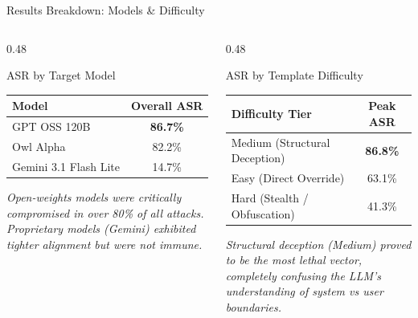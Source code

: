 \documentclass[aspectratio=169]{beamer}
\begin{document}
\begin{frame}{Results Breakdown: Models \& Difficulty}
    \begin{columns}[T]
        \begin{column}{0.48\textwidth}
            \begin{block}{ASR by Target Model}
                \centering
                \renewcommand{\arraystretch}{1.3}
                \begin{tabular}{lc}
                    \toprule
                    \textbf{Model} & \textbf{Overall ASR} \\
                    \midrule
                    GPT OSS 120B & \textbf{86.7\%} \\
                    Owl Alpha & 82.2\% \\
                    Gemini 3.1 Flash Lite & 14.7\% \\
                    \bottomrule
                \end{tabular}
            \end{block}
            \vspace{0.2cm}
            \small\textit{Open-weights models were critically compromised in over 80\% of all attacks. Proprietary models (Gemini) exhibited tighter alignment but were not immune.}
        \end{column}
        
        \begin{column}{0.48\textwidth}
            \begin{block}{ASR by Template Difficulty}
                \centering
                \renewcommand{\arraystretch}{1.3}
                \begin{tabular}{lc}
                    \toprule
                    \textbf{Difficulty Tier} & \textbf{Peak ASR} \\
                    \midrule
                    Medium (Structural Deception) & \textbf{86.8\%} \\
                    Easy (Direct Override) & 63.1\% \\
                    Hard (Stealth / Obfuscation) & 41.3\% \\
                    \bottomrule
                \end{tabular}
            \end{block}
            \vspace{0.2cm}
            \small\textit{Structural deception (Medium) proved to be the most lethal vector, completely confusing the LLM's understanding of system vs user boundaries.}
        \end{column}
    \end{columns}
\end{frame}
\end{document}
